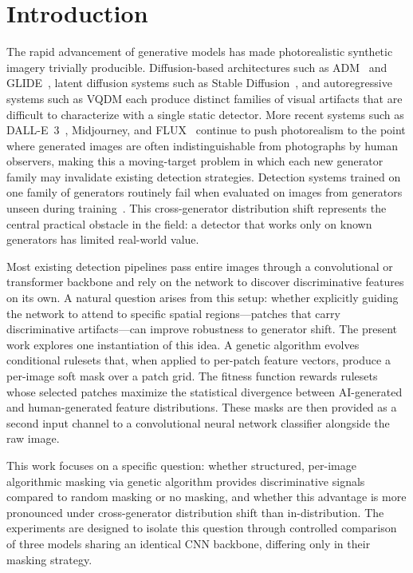 \documentclass[runningheads]{llncs}
\begin{document}
\section{Introduction}

The rapid advancement of generative models has made photorealistic synthetic imagery trivially producible. Diffusion-based architectures such as ADM~\cite{dhariwal2021diffusion} and GLIDE~\cite{nichol2022glide}, latent diffusion systems such as Stable Diffusion~\cite{rombach2022highresolution}, and autoregressive systems such as VQDM each produce distinct families of visual artifacts that are difficult to characterize with a single static detector. More recent systems such as DALL-E~3~\cite{betker2023dalle3}, Midjourney, and FLUX~\cite{flux2024} continue to push photorealism to the point where generated images are often indistinguishable from photographs by human observers, making this a moving-target problem in which each new generator family may invalidate existing detection strategies. Detection systems trained on one family of generators routinely fail when evaluated on images from generators unseen during training~\cite{zhu2023genimage}. This cross-generator distribution shift represents the central practical obstacle in the field: a detector that works only on known generators has limited real-world value.

Most existing detection pipelines pass entire images through a convolutional or transformer backbone and rely on the network to discover discriminative features on its own. A natural question arises from this setup: whether explicitly guiding the network to attend to specific spatial regions---patches that carry discriminative artifacts---can improve robustness to generator shift. The present work explores one instantiation of this idea. A genetic algorithm evolves conditional rulesets that, when applied to per-patch feature vectors, produce a per-image soft mask over a patch grid. The fitness function rewards rulesets whose selected patches maximize the statistical divergence between AI-generated and human-generated feature distributions. These masks are then provided as a second input channel to a convolutional neural network classifier alongside the raw image.

This work focuses on a specific question: whether structured, per-image algorithmic masking via genetic algorithm provides discriminative signals compared to random masking or no masking, and whether this advantage is more pronounced under cross-generator distribution shift than in-distribution. The experiments are designed to isolate this question through controlled comparison of three models sharing an identical CNN backbone, differing only in their masking strategy.
\end{document}
